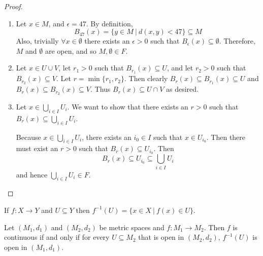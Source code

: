 \begin{proof}
\begin{enumerate}
\item Let $x\in M$, and $\epsilon = 47$.  By definition,
\[B_{47} (x) = \{y\in M\ |\ d(x,y)<47\} \subseteq M\]
Also, trivially $\forall x\in \emptyset$ there exists an $\epsilon > 0$ such that $B_\epsilon (x) \subseteq \emptyset$.  Therefore, $M$ and $\emptyset$ are open, and so $M, \emptyset\in F$.

\item Let $x\in U\cup V$, let $r_1 >0$ such that $B_{r_1} (x) \subseteq U$, and let $r_2 >0$ such that $B_{r_2} (x) \subseteq V$.  Let $r = \min\{r_1, r_2 \}$.  Then clearly $B_r (x) \subseteq B_{r_1} (x) \subseteq U$ and $B_r (x) \subseteq B_{r_2} (x) \subseteq V$.  Thus  $B_r (x) \subseteq U \cap V$ as desired.

\item Let $x \in \bigcup_{i\in I} U_i$.  We want to show that there exists an $r>0$ such that $B_r (x) \subseteq \bigcup_{i\in I} U_i$.  

Because $x\in \bigcup_{i\in I} U_i$, there exists an $i_0 \in I$ such that $x\in U_{i_0}$.  Then there must exist an $r>0$ such that $B_r (x) \subseteq U_{i_0}$.  Then
\[B_r (x) \subseteq U_{i_0} \subseteq \bigcup_{i\in I} U_i\]
and hence $\bigcup_{i\in I} U_i\in F$.
\end{enumerate}
\end{proof}

\begin{definition}
If $f:X \to Y$ and $U \subseteq Y$ then $f^{-1} (U) = \{x\in X\ |\ f(x) \in U\}$.
\end{definition}

\begin{theorem}
Let $(M_1, d_1)$ and $(M_2, d_2)$ be metric spaces and $f: M_1 \to M_2$. Then $f$ is continuous if and only if for every $U \subseteq M_2$ that is open in $(M_2,
d_2)$, $f^{-1} (U)$ is open in $(M_1, d_1)$.
\end{theorem}

